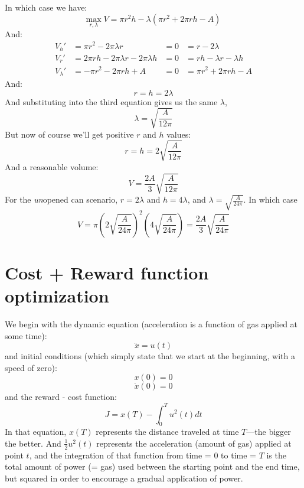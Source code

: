 \documentclass[11pt]{report}
\begin{document}
In which case we have:
\[ \underset{r,\lambda}{\text{max}}\;V = \pi r^2h - \lambda(\pi r^2 + 2\pi rh - A) \]
And:
\begin{align*}
  V_h' &= \pi r^2 - 2\pi\lambda r                 &= 0 &= r - 2\lambda \\
  V_r' &= 2\pi rh - 2\pi\lambda r - 2\pi\lambda h &= 0 &= rh - \lambda r - \lambda h \\
  V_\lambda' &= - \pi r^2 - 2\pi rh + A           &= 0 &= \pi r^2 + 2\pi rh - A
\end{align*}
And:
\[ r = h = 2\lambda \]
And substituting into the third equation gives us the same $\lambda$,
\[ \lambda = \sqrt{\frac{A}{12\pi}} \]
But now of course we'll get positive $r$ and $h$ values:
\[ r = h = 2\sqrt{\frac{A}{12\pi}} \]
And a reasonable volume:
\[ V = \frac{2A}{3}\sqrt{\frac{A}{12\pi}} \]
For the \emph{un}opened can scenario, $r = 2\lambda$ and $h = 4\lambda$, and $\lambda = \sqrt{\frac{A}{24\pi}}$.
In which case
\[ V =
      \pi \left(2\sqrt{\frac{A}{24\pi}}\right)^2 \left(4\sqrt{\frac{A}{24\pi}}\right) =
      \frac{2A}{3}\sqrt{\frac{A}{24\pi}}
 \]









\section{Cost + Reward function optimization}

We begin with the dynamic equation (acceleration is a function of gas applied at some time):
\[ \ddot{x} = u(t) \]
and initial conditions (which simply state that we start at the beginning, with a speed of zero):
\[ x(0) = 0 \]
\[ \dot{x}(0) = 0 \]
and the reward - cost function:
\[ J = x(T) -  \int^T_0 u^2(t) dt \]
In that equation, $x(T)$ represents the distance traveled at time $T$---the bigger the better. And $\frac{1}{2} u^2(t)$ represents the acceleration (amount of gas) applied at point $t$, and the integration of that function from time = 0 to time = $T$ is the total amount of power (= gas) used between the starting point and the end time, but squared in order to encourage a gradual application of power.
\end{document}
